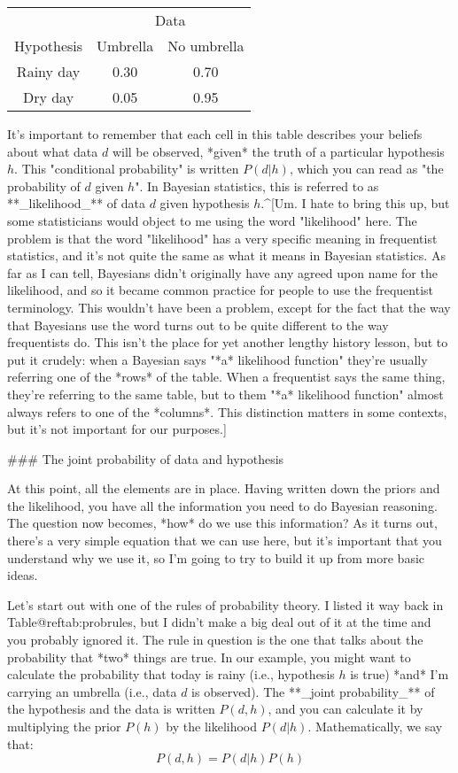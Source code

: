 \begin{center}
\begin{tabular}{c|cc}
 & \multicolumn{2}{|c}{Data} \\ 
Hypothesis & Umbrella & No umbrella \\ \hline
Rainy day & 0.30 & 0.70 \\
Dry day & 0.05 & 0.95 
\end{tabular}
\end{center}


It's important to remember that each cell in this table describes your beliefs about what data $d$ will be observed, *given* the truth of a particular hypothesis $h$. This "conditional probability" is written $P(d|h)$, which you can read as "the probability of $d$ given $h$". In Bayesian statistics, this is referred to as **_likelihood_** of data $d$ given hypothesis $h$.^[Um. I hate to bring this up, but some statisticians would object to me using the word "likelihood" here. The problem is that the word "likelihood" has a very specific meaning in frequentist statistics, and it's not quite the same as what it means in Bayesian statistics. As far as I can tell, Bayesians didn't originally have any agreed upon name for the likelihood, and so it became common practice for people to use the frequentist terminology. This wouldn't have been a problem, except for the fact that the way that Bayesians use the word turns out to be quite different to the way frequentists do. This isn't the place for yet another lengthy history lesson, but to put it crudely: when a Bayesian says "*a* likelihood function" they're usually referring one of the *rows* of the table. When a frequentist says the same thing, they're referring to the same table, but to them "*a* likelihood function" almost always refers to one of the *columns*. This distinction matters in some contexts, but it's not important for our purposes.]

### The joint probability of data and hypothesis

At this point, all the elements are in place. Having written down the priors and the likelihood, you have all the information you need to do Bayesian reasoning. The question now becomes, *how* do we use this information? As it turns out, there's a very simple equation that we can use here, but it's important that you understand why we use it, so I'm going to try to build it up from more basic ideas.

Let's start out with one of the rules of probability theory. I listed it way back in Table@reftab:probrules, but I didn't make a big deal out of it at the time and you probably ignored it. The rule in question is the one that talks about the probability that *two* things are true. In our example, you might want to calculate the probability that today is rainy (i.e., hypothesis $h$ is true) *and* I'm carrying an umbrella (i.e., data $d$ is observed). The **_joint probability_** of the hypothesis and the data is written $P(d,h)$, and you can calculate it by multiplying the prior $P(h)$ by the likelihood $P(d|h)$. Mathematically, we say that:
$$
P(d,h) = P(d|h) P(h)
$$



